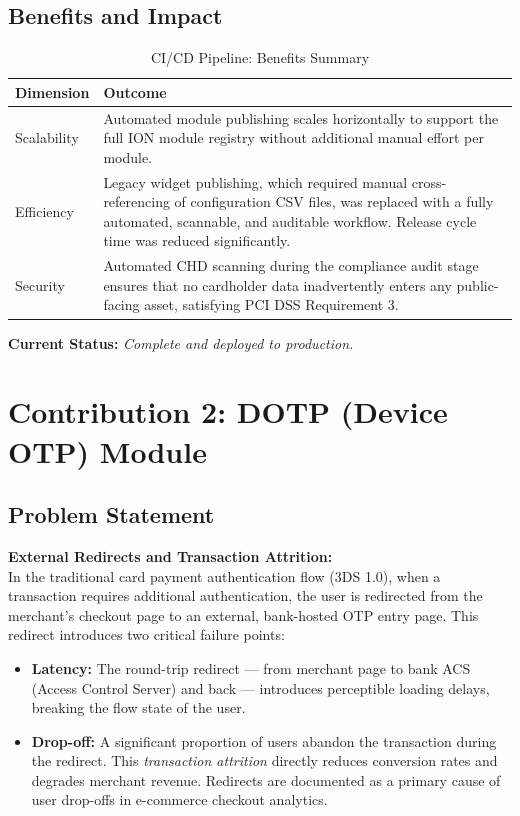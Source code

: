 \subsection{Benefits and Impact}

\begin{table}[ht]
\centering
\caption{CI/CD Pipeline: Benefits Summary}
\label{tab:cicd_benefits}
\begin{tabular}{p{3cm} p{10cm}}
\toprule
\textbf{Dimension} & \textbf{Outcome} \\
\midrule
Scalability   & Automated module publishing scales horizontally to support the full ION module registry without additional manual effort per module. \\
\midrule
Efficiency    & Legacy widget publishing, which required manual cross-referencing of configuration CSV files, was replaced with a fully automated, scannable, and auditable workflow. Release cycle time was reduced significantly. \\
\midrule
Security      & Automated CHD scanning during the compliance audit stage ensures that no cardholder data inadvertently enters any public-facing asset, satisfying PCI DSS Requirement 3. \\
\bottomrule
\end{tabular}
\end{table}

\noindent \textbf{Current Status:} \textit{Complete and deployed to production.}

\section{Contribution 2: DOTP (Device OTP) Module}

\subsection{Problem Statement}

\textbf{External Redirects and Transaction Attrition:}\\
In the traditional card payment authentication flow (3DS 1.0), when a transaction requires additional authentication, the user is redirected from the merchant's checkout page to an external, bank-hosted OTP entry page. This redirect introduces two critical failure points:

\begin{itemize}
  \item \textbf{Latency:} The round-trip redirect --- from merchant page to bank ACS (Access Control Server) and back --- introduces perceptible loading delays, breaking the flow state of the user.
  \item \textbf{Drop-off:} A significant proportion of users abandon the transaction during the redirect. This \textit{transaction attrition} directly reduces conversion rates and degrades merchant revenue. Redirects are documented as a primary cause of user drop-offs in e-commerce checkout analytics.
\end{itemize}

